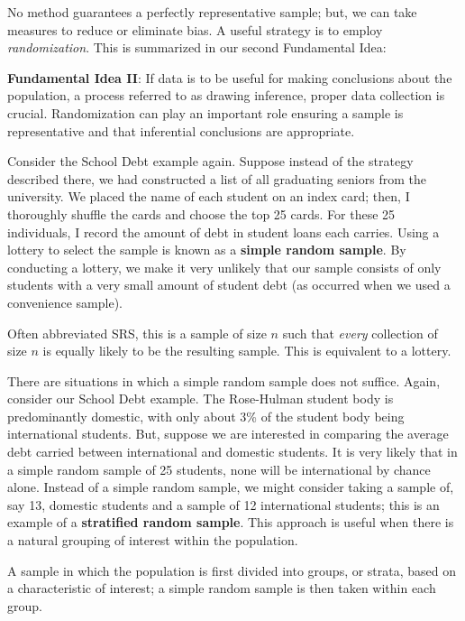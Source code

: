 \documentclass[]{book}
\theoremstyle{definition}
\theoremstyle{definition}
\theoremstyle{remark}
\let\BeginKnitrBlock\begin \let\EndKnitrBlock\end
\begin{document}
No method guarantees a perfectly representative sample; but, we can take
measures to reduce or eliminate bias. A useful strategy is to employ
\emph{randomization}. This is summarized in our second Fundamental Idea:

\BeginKnitrBlock{rmdfivefund}
\textbf{Fundamental Idea II}: If data is to be useful for making
conclusions about the population, a process referred to as drawing
inference, proper data collection is crucial. Randomization can play an
important role ensuring a sample is representative and that inferential
conclusions are appropriate.
\EndKnitrBlock{rmdfivefund}

Consider the School Debt example again. Suppose instead of the strategy
described there, we had constructed a list of all graduating seniors
from the university. We placed the name of each student on an index
card; then, I thoroughly shuffle the cards and choose the top 25 cards.
For these 25 individuals, I record the amount of debt in student loans
each carries. Using a lottery to select the sample is known as a
\textbf{simple random sample}. By conducting a lottery, we make it very
unlikely that our sample consists of only students with a very small
amount of student debt (as occurred when we used a convenience sample).

\BeginKnitrBlock{definition}[Simple Random Sample]
\protect\hypertarget{def:defn-simple-random-sample}{}{\label{def:defn-simple-random-sample}
{} }Often abbreviated SRS, this is a
sample of size \(n\) such that \emph{every} collection of size \(n\) is
equally likely to be the resulting sample. This is equivalent to a
lottery.
\EndKnitrBlock{definition}

There are situations in which a simple random sample does not suffice.
Again, consider our School Debt example. The Rose-Hulman student body is
predominantly domestic, with only about 3\% of the student body being
international students. But, suppose we are interested in comparing the
average debt carried between international and domestic students. It is
very likely that in a simple random sample of 25 students, none will be
international by chance alone. Instead of a simple random sample, we
might consider taking a sample of, say 13, domestic students and a
sample of 12 international students; this is an example of a
\textbf{stratified random sample}. This approach is useful when there is
a natural grouping of interest within the population.

\BeginKnitrBlock{definition}[Stratified Random Sample]
\protect\hypertarget{def:defn-stratified-random-sample}{}{\label{def:defn-stratified-random-sample}
{} }A sample in which the
population is first divided into groups, or strata, based on a
characteristic of interest; a simple random sample is then taken within
each group.
\EndKnitrBlock{definition}
\end{document}
